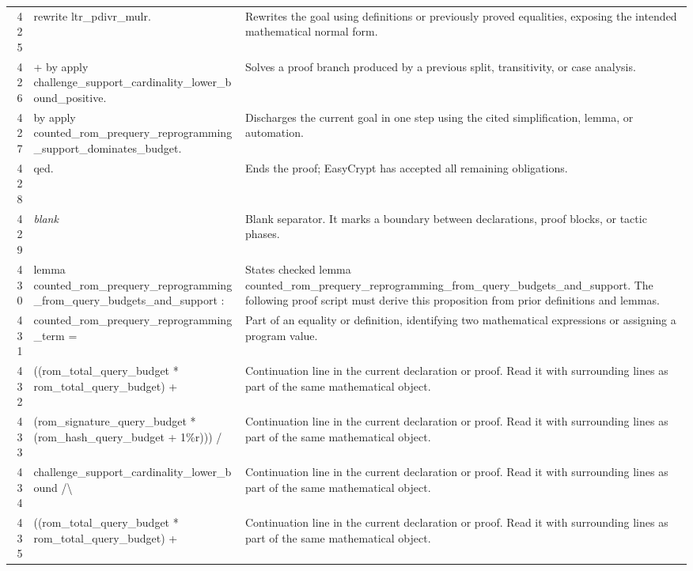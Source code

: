 \documentclass[10pt]{article}
\begin{document}
\begin{longtable}{r L{0.53\textwidth} L{0.37\textwidth}}
425 & {\ttfamily\scriptsize rewrite ltr\_pdivr\_mulr.} & Rewrites the goal using definitions or previously proved equalities, exposing the intended mathematical normal form. \\
426 & {\ttfamily\scriptsize + by apply challenge\_support\_cardinality\_lower\_bound\_positive.} & Solves a proof branch produced by a previous split, transitivity, or case analysis. \\
427 & {\ttfamily\scriptsize by apply counted\_rom\_prequery\_reprogramming\_support\_dominates\_budget.} & Discharges the current goal in one step using the cited simplification, lemma, or automation. \\
428 & {\ttfamily\scriptsize qed.} & Ends the proof; EasyCrypt has accepted all remaining obligations. \\
429 & {\ttfamily\scriptsize \emph{blank}} & Blank separator.  It marks a boundary between declarations, proof blocks, or tactic phases. \\
430 & {\ttfamily\scriptsize lemma counted\_rom\_prequery\_reprogramming\_from\_query\_budgets\_and\_support :} & States checked lemma counted\_rom\_prequery\_reprogramming\_from\_query\_budgets\_and\_support.  The following proof script must derive this proposition from prior definitions and lemmas. \\
431 & {\ttfamily\scriptsize   counted\_rom\_prequery\_reprogramming\_term =} & Part of an equality or definition, identifying two mathematical expressions or assigning a program value. \\
432 & {\ttfamily\scriptsize     ((rom\_total\_query\_budget * rom\_total\_query\_budget) +} & Continuation line in the current declaration or proof.  Read it with surrounding lines as part of the same mathematical object. \\
433 & {\ttfamily\scriptsize      (rom\_signature\_query\_budget * (rom\_hash\_query\_budget + 1\%r))) /} & Continuation line in the current declaration or proof.  Read it with surrounding lines as part of the same mathematical object. \\
434 & {\ttfamily\scriptsize     challenge\_support\_cardinality\_lower\_bound /\textbackslash{}} & Continuation line in the current declaration or proof.  Read it with surrounding lines as part of the same mathematical object. \\
435 & {\ttfamily\scriptsize   ((rom\_total\_query\_budget * rom\_total\_query\_budget) +} & Continuation line in the current declaration or proof.  Read it with surrounding lines as part of the same mathematical object. \\

\end{longtable}
\end{document}
